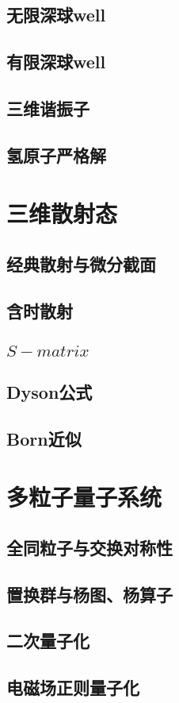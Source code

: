 \documentclass{book}
\begin{document}
\section{无限深球well}
\section{有限深球well}
\section{三维谐振子}
\section{氢原子严格解}
\chapter{三维散射态}
\section{经典散射与微分截面}
\section{含时散射}
\section{$S-matrix$}
\section{Dyson公式}
\section{Born近似}
\chapter{多粒子量子系统}
\section{全同粒子与交换对称性}
\section{置换群与杨图、杨算子}
\section{二次量子化}
\section{电磁场正则量子化}
\end{document}
